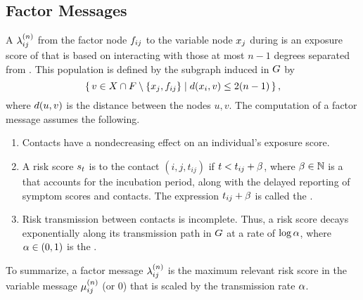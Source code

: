 \subsection{Factor Messages}

A  $\lambda_{ij}^{(n)}$ from the factor node $\vFactor[ij]$ to the variable node $\vVariable[j]$ during  is an exposure score of  that is based on interacting with those at most $n - 1$ degrees separated from . This population is defined by the subgraph induced in $G$ by
\begin{equation*}
  \setBuilder{v \in \vVariables \cap \vFactors \setminus \{\vVariable[j], \vFactor[ij]\}}{\dist(\vVariable[i], v) \leq 2(n - 1)},
\end{equation*}
where $d(u, v)$ is the distance between the nodes $u, v$. The computation of a factor message assumes the following.
\begin{enumerate}
  \item Contacts have a nondecreasing effect on an individual's exposure score.
  \item A risk score $s_t$ is  to the contact $(i, j, t_{ij})$ if $t < t_{ij} +\beta$, where $\beta \in \mathbb{N}$ is a  that accounts for the incubation period, along with the delayed reporting of symptom scores and contacts. The expression $t_{ij} +\beta$ is called the .
  \item Risk transmission between contacts is incomplete. Thus, a risk score decays exponentially along its transmission path in $G$ at a rate of $\log \alpha$, where $\alpha \in (0, 1)$ is the .
\end{enumerate}
To summarize, a factor message $\lambda_{ij}^{(n)}$ is the maximum relevant risk score in the variable message $\mu_{ij}^{(n)}$ (or 0) that is scaled by the transmission rate $\alpha$.

